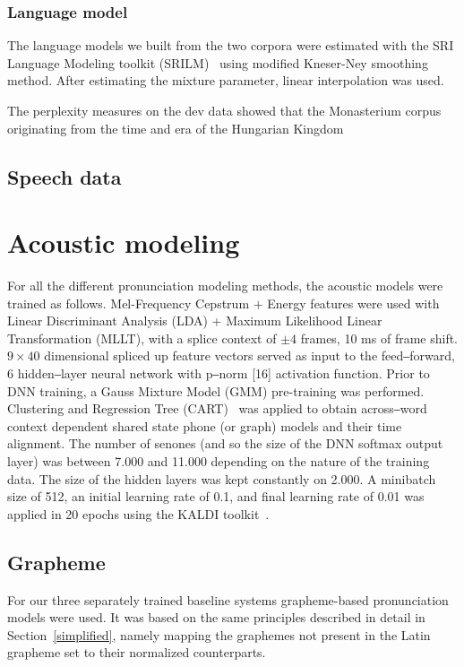 \documentclass[runningheads,a4paper]{llncs}
\begin{document}
\subsubsection{Language model}
The language models we built from the two corpora were estimated with the SRI Language Modeling toolkit (SRILM)~\cite{srilm} using modified Kneser-Ney smoothing method.
After estimating the mixture parameter, linear interpolation was used.

The perplexity measures on the dev data showed that the Monasterium corpus originating from the time and era of the Hungarian Kingdom
\subsection{Speech data}
\section{Acoustic modeling}
For all the different pronunciation modeling methods, the acoustic models were trained as follows.
Mel-Frequency Cepstrum $+$ Energy features were used with Linear Discriminant Analysis (LDA) + Maximum Likelihood Linear Transformation (MLLT), with a splice context of $\pm4$ frames, 10 ms of frame shift.
$9\times40$ dimensional spliced up feature vectors served as input to the feed‒forward, 6 hidden‒layer neural network with p‒norm [16] activation function.
Prior to DNN training, a Gauss Mixture Model (GMM) pre-training was performed.
Clustering and Regression Tree (CART)~\cite{kaldi} was applied to obtain across‒word context dependent shared state phone (or graph) models and their time alignment.
The number of senones (and so the size of the DNN softmax output layer) was between 7.000 and 11.000 depending on the nature of the training data.
The size of the hidden layers was kept constantly on 2.000.
A minibatch size of 512, an initial learning rate of 0.1, and final learning rate of 0.01 was applied in 20 epochs using the KALDI toolkit~\cite{kaldi}.
\subsection{Grapheme}
For our three separately trained baseline systems grapheme-based pronunciation models were used.
It was based on the same principles described in detail in Section~\ref{simplified}, namely mapping the graphemes not present in the Latin grapheme set to their normalized counterparts.
\end{document}
